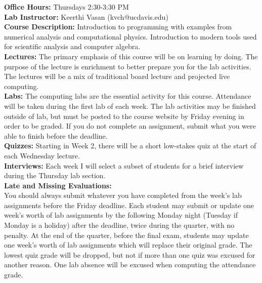 \documentclass[12pt]{article}
\begin{document}
\noindent
\textbf{Office Hours:} Thursdays 2:30-3:30 PM \\

\noindent
\textbf{Lab Instructor:} Keerthi Vasan (kvch@ucdavis.edu) \\

\noindent
\textbf {Course Description:}  
Introduction to programming with examples from numerical analysis and
computational physics. Introduction to modern tools used for
scientific analysis and computer algebra.\\

\noindent \textbf{Lectures:} 
The primary emphasis of this course will be on learning by doing.  The
purpose of the lecture is enrichment to better prepare you for the lab
activities.  The lectures will be a mix of traditional board lecture
and projected live computing.\\

\noindent 
\textbf{Labs:} The computing labs are the essential activity
for this course.  Attendance will be taken during the first lab of
each week.  The lab activities may be finished outside of lab, but
must be posted to the course website by Friday evening in order to be
graded.  If you do not complete an assignment, submit what you were
able to finish before the deadline.\\

\noindent
\textbf{Quizzes:} Starting in Week 2, there will be a short low-stakes
quiz at the start of each Wednesday lecture.  \\

\noindent
\textbf{Interviews:} Each week I will select a subset of students for
a brief interview during the Thursday lab section. \\

\noindent \textbf{Late and Missing Evaluations:}\\ 
You should always submit whatever you have completed from the week's
lab assignments before the Friday deadline.  Each student may submit
or update one week's worth of lab assignments by the following Monday
night (Tuesday if Monday is a holiday) after the deadline, twice
during the quarter, with no penalty.  At the end of the quarter,
before the final exam, students may update one week's worth of lab
assignments which will replace their original grade.  The lowest quiz
grade will be dropped, but not if more than one quiz was excused for
another reason.  One lab absence will be excused when computing the
attendance grade.\\
\end{document}
